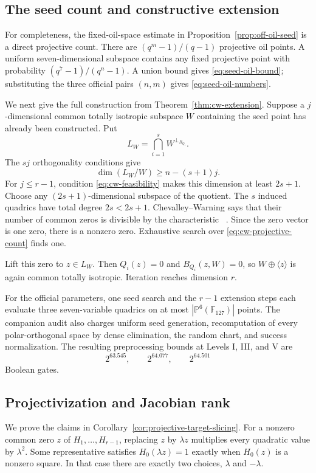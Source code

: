 \documentclass[11pt,a4paper]{article}
\theoremstyle{definition}
\theoremstyle{remark}
\newcommand{\F}{\mathbb F}
\newcommand{\PP}{\mathbb P}
\begin{document}
\subsection{The seed count and constructive extension}

For completeness, the fixed-oil-space estimate in
Proposition~\ref{prop:off-oil-seed} is a direct projective count.  There are
$(q^m-1)/(q-1)$ projective oil points.  A uniform seven-dimensional subspace
contains any fixed projective point with probability
$(q^7-1)/(q^n-1)$.  A union bound gives \eqref{eq:seed-oil-bound}; substituting
the three official pairs $(n,m)$ gives \eqref{eq:seed-oil-numbers}.

We next give the full construction from Theorem~\ref{thm:cw-extension}.
Suppose a $j$-dimensional common totally isotropic subspace $W$ containing the
seed point has already been constructed.  Put
\[
 L_W=\bigcap_{i=1}^s W^{\perp_{B_{Q_i}}}.
\]
The $sj$ orthogonality conditions give
\[
 \dim(L_W/W)\ge n-(s+1)j.
\]
For $j\le r-1$, condition \eqref{eq:cw-feasibility} makes this dimension at
least $2s+1$.  Choose any $(2s+1)$-dimensional subspace of the quotient.  The
$s$ induced quadrics have total degree $2s<2s+1$.  Chevalley--Warning says
that their number of common zeros is divisible by the characteristic
~\cite{Chevalley1935,Warning1935}.  Since the zero vector is one zero, there
is a nonzero zero.  Exhaustive search over \eqref{eq:cw-projective-count}
finds one.

Lift this zero to $z\in L_W$.  Then $Q_i(z)=0$ and
$B_{Q_i}(z,W)=0$, so $W\oplus\langle z\rangle$ is again common totally
isotropic.  Iteration reaches dimension $r$.

For the official parameters, one seed search and the $r-1$ extension steps
each evaluate three seven-variable quadrics on at most
$|\PP^6(\F_{127})|$ points.  The companion audit also charges uniform seed
generation, recomputation of every polar-orthogonal space by dense
elimination, the random chart, and success normalization.  The resulting
preprocessing bounds at Levels I, III, and V are
\[
 2^{63.545},\qquad2^{64.077},\qquad2^{64.501}
\]
Boolean gates.

\subsection{Projectivization and Jacobian rank}

We prove the claims in Corollary~\ref{cor:projective-target-slicing}.  For a
nonzero common zero $z$ of $H_1,\ldots,H_{r-1}$, replacing $z$ by $\lambda z$
multiplies every quadratic value by $\lambda^2$.  Some representative
satisfies $H_0(\lambda z)=1$ exactly when $H_0(z)$ is a nonzero square.  In
that case there are exactly two choices, $\lambda$ and $-\lambda$.
\end{document}
